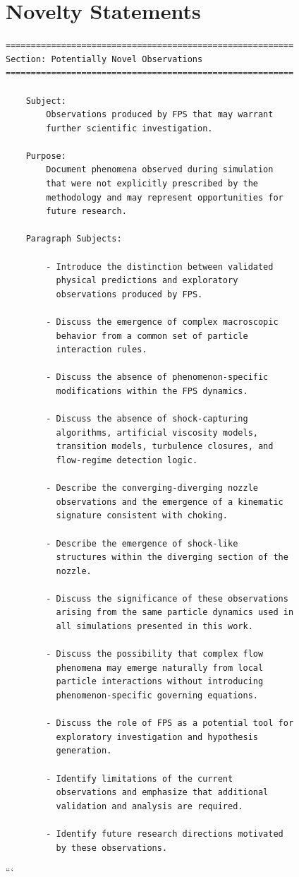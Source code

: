 
\newpage
\section{Novelty Statements}
\begin{verbatim}
=========================================================
Section: Potentially Novel Observations
=========================================================

    Subject:
        Observations produced by FPS that may warrant
        further scientific investigation.

    Purpose:
        Document phenomena observed during simulation
        that were not explicitly prescribed by the
        methodology and may represent opportunities for
        future research.

    Paragraph Subjects:

        - Introduce the distinction between validated
          physical predictions and exploratory
          observations produced by FPS.

        - Discuss the emergence of complex macroscopic
          behavior from a common set of particle
          interaction rules.

        - Discuss the absence of phenomenon-specific
          modifications within the FPS dynamics.

        - Discuss the absence of shock-capturing
          algorithms, artificial viscosity models,
          transition models, turbulence closures, and
          flow-regime detection logic.

        - Describe the converging-diverging nozzle
          observations and the emergence of a kinematic
          signature consistent with choking.

        - Describe the emergence of shock-like
          structures within the diverging section of the
          nozzle.

        - Discuss the significance of these observations
          arising from the same particle dynamics used in
          all simulations presented in this work.

        - Discuss the possibility that complex flow
          phenomena may emerge naturally from local
          particle interactions without introducing
          phenomenon-specific governing equations.

        - Discuss the role of FPS as a potential tool for
          exploratory investigation and hypothesis
          generation.

        - Identify limitations of the current
          observations and emphasize that additional
          validation and analysis are required.

        - Identify future research directions motivated
          by these observations.

\end{verbatim}
```
